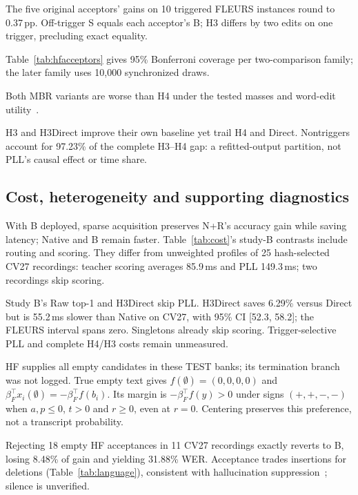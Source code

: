 The five original acceptors' gains on 10 triggered FLEURS instances round to 0.37\,pp. Off-trigger S equals each acceptor's B; H3 differs by two edits on one trigger, precluding exact equality. 

\begin{samepage}
Table~\ref{tab:hfacceptors} gives 95\% Bonferroni coverage per two-comparison family; the later family uses 10,000 synchronized draws.\par
\end{samepage}

Both MBR variants are worse than H4 under the tested masses and word-edit utility~\cite{jinnai2025mbrasr}.

H3 and H3Direct improve their own baseline yet trail H4 and Direct. Nontriggers account for 97.23\% of the complete H3--H4 gap: a refitted-output partition, not PLL's causal effect or time share.

\subsection{Cost, heterogeneity and supporting diagnostics}

With B deployed, sparse acquisition preserves N+R's accuracy gain while saving latency; Native and B remain faster. Table~\ref{tab:cost}'s study-B contrasts include routing and scoring. They differ from unweighted profiles of 25 hash-selected CV27 recordings: teacher scoring averages 85.9\,ms and PLL 149.3\,ms; two recordings skip scoring.

Study B's Raw top-1 and H3Direct skip PLL. H3Direct saves 6.29\% versus Direct but is 55.2\,ms slower than Native on CV27, with 95\% CI [52.3, 58.2]; the FLEURS interval spans zero. Singletons already skip scoring. Trigger-selective PLL and complete H4/H3 costs remain unmeasured.


HF supplies all empty candidates in these TEST banks; its termination branch was not logged. True empty text gives $f(\emptyset)=(0,0,0,0)$ and $\beta_F^\top x_i(\emptyset)=-\beta_F^\top f(b_i)$. Its margin is $-\beta_F^\top f(y)>0$ under signs $(+,+,-,-)$ when $a,p\le0$, $t>0$ and $r\ge0$, even at $r=0$. Centering preserves this preference, not a transcript probability.

Rejecting 18 empty HF acceptances in 11 CV27 recordings exactly reverts to B, losing 8.48\% of gain and yielding 31.88\% WER. Acceptance trades insertions for deletions (Table~\ref{tab:language}), consistent with hallucination suppression~\cite{baranski2025nonspeech}; silence is unverified.


